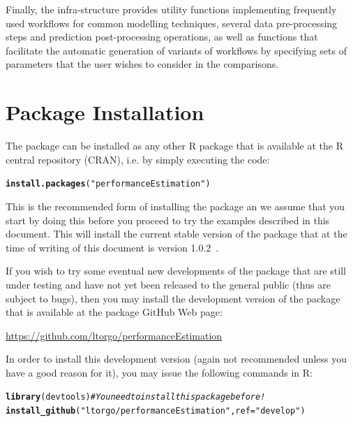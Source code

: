 \documentclass[10pt,a4paper]{article}\usepackage[]{graphicx}\usepackage[]{color}
\makeatletter
\newcommand{\hlstr}[1]{\textcolor[rgb]{0.192,0.494,0.8}{#1}}%
\newcommand{\hlcom}[1]{\textcolor[rgb]{0.678,0.584,0.686}{\textit{#1}}}%
\newcommand{\hlstd}[1]{\textcolor[rgb]{0.345,0.345,0.345}{#1}}%
\newcommand{\hlkwc}[1]{\textcolor[rgb]{0.333,0.667,0.333}{#1}}%
\newcommand{\hlkwd}[1]{\textcolor[rgb]{0.737,0.353,0.396}{\textbf{#1}}}%
\newenvironment{kframe}{%
 \def\at@end@of@kframe{}%
 \ifinner\ifhmode%
  \def\at@end@of@kframe{\end{minipage}}%
  \begin{minipage}{\columnwidth}%
 \fi\fi%
 \def\FrameCommand##1{\hskip\@totalleftmargin \hskip-\fboxsep
 \colorbox{shadecolor}{##1}\hskip-\fboxsep
     \hskip-\linewidth \hskip-\@totalleftmargin \hskip\columnwidth}%
 \MakeFramed {\advance\hsize-\width
   \@totalleftmargin\z@ \linewidth\hsize
   \@setminipage}}%
 {\par\unskip\endMakeFramed%
 \at@end@of@kframe}
\newenvironment{knitrout}{}{} %
\newcommand{\PEversion}{1.0.2\ }
\makeatother
\begin{document}
Finally, the infra-structure provides utility functions
implementing frequently used workflows for common modelling techniques, several data pre-processing steps and prediction post-processing operations, as
well as functions that facilitate the automatic generation of variants
of workflows by specifying sets of parameters that the user wishes to
consider in the comparisons.

\section{Package Installation}\label{sec:install}

The package can be installed as any other R package that is available at the R central repository (CRAN), i.e. by simply executing the code:

\begin{knitrout}\footnotesize
{}\color{fgcolor}\begin{kframe}
\begin{alltt}
\hlkwd{install.packages}\hlstd{(}\hlstr{"performanceEstimation"}\hlstd{)}
\end{alltt}
\end{kframe}
\end{knitrout}

This is the recommended form of installing the package an we assume that you start by doing this before you proceed to try the examples described in this document. This will install the current stable version of the package that at the time of writing of this document is version \PEversion.

If you wish to try some eventual new developments of the package that are still under testing and have not yet been released to the general public (thus are subject to bugs), then you may install the development version of the package that is available at the package GitHub Web page:

\url{https://github.com/ltorgo/performanceEstimation}

In order to install this development version (again not recommended unless you have a good reason for it), you may issue the following commands in R:

\begin{knitrout}\footnotesize
{}\color{fgcolor}\begin{kframe}
\begin{alltt}
\hlkwd{library}\hlstd{(devtools)}  \hlcom{# You need to install this package before!}
\hlkwd{install_github}\hlstd{(}\hlstr{"ltorgo/performanceEstimation"}\hlstd{,}\hlkwc{ref}\hlstd{=}\hlstr{"develop"}\hlstd{)}
\end{alltt}
\end{kframe}
\end{knitrout}
\end{document}
